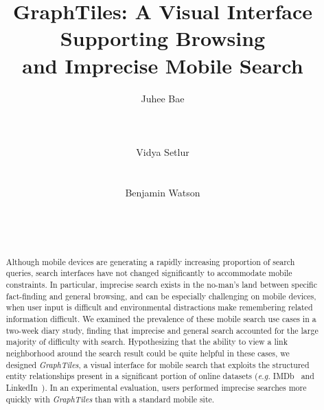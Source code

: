 \documentclass{sigchi}
\begin{document}
\title{GraphTiles: A Visual Interface Supporting Browsing \\and Imprecise Mobile Search}

\author{
  \alignauthor Juhee Bae\\
    \\
     \\
    \\
  \alignauthor Vidya Setlur\\
    \\
    \\ 
  \alignauthor Benjamin Watson\\
    \\
     \\
    \\
}


\maketitle


\begin{abstract}
Although mobile devices are generating a rapidly increasing proportion of search queries, search interfaces have not changed significantly to accommodate mobile constraints. In particular, imprecise search exists in the no-man's land between specific fact-finding and general browsing, and can be especially challenging on mobile devices, when user input is difficult and environmental distractions make remembering related information difficult. We examined the prevalence of these mobile search use cases in a two-week diary study, finding that imprecise and general search accounted for the large majority of difficulty with search. Hypothesizing that the ability to view a link neighborhood around the search result could be quite helpful in these cases, we designed \textit{GraphTiles}, a visual interface for mobile search that exploits the structured entity relationships present in a significant portion of online datasets (\textit{e.g.} IMDb~\cite{imdb} and LinkedIn~\cite{linkedin}). In an experimental evaluation, users performed imprecise searches more quickly with \textit{GraphTiles} than with a standard mobile site. 
\end{abstract}
\end{document}
